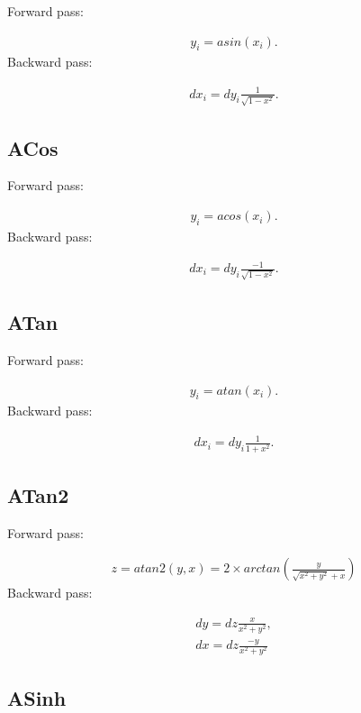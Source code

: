 \documentclass{article}
\begin{document}
Forward pass:

\begin{eqnarray}
  y_i = asin (x_i).
\end{eqnarray}
%
Backward pass:

\begin{eqnarray}
  dx_i = dy_i \frac{1}{\sqrt{1 - x^2}}.
\end{eqnarray}


\subsection{ACos}

Forward pass:

\begin{eqnarray}
  y_i = acos (x_i).
\end{eqnarray}
%
Backward pass:

\begin{eqnarray}
  dx_i = dy_i \frac{-1}{\sqrt{1 - x^2}}.
\end{eqnarray}


\subsection{ATan}

Forward pass:

\begin{eqnarray}
  y_i = atan (x_i).
\end{eqnarray}
%
Backward pass:

\begin{eqnarray}
  dx_i = dy_i \frac{1}{1 + x^2}.
\end{eqnarray}


\subsection{ATan2}

Forward pass:

\begin{eqnarray}
  z = atan2(y, x) = 2 \times arctan(\frac{y}{\sqrt{x^2 + y^2} + x})
\end{eqnarray}
%
Backward pass:

\begin{eqnarray}
  dy = dz \frac{x}{x^2 + y^2}, \\
  dx = dz \frac{-y}{x^2 + y^2}
\end{eqnarray}


\subsection{ASinh}
\end{document}
